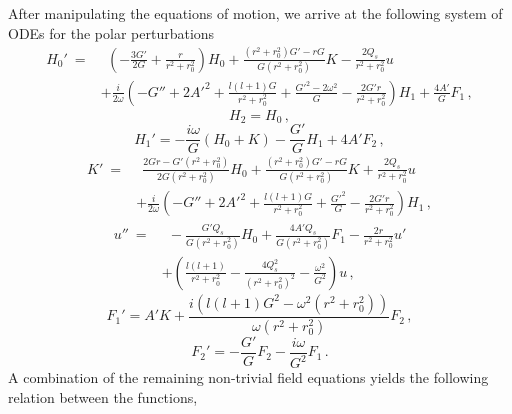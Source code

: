 \documentclass[11pt,a4paper]{article}
\begin{document}
After manipulating the equations of motion, we arrive at the following system of ODEs for the polar perturbations
%
\begin{equation}\label{eq_H0_polar}
\begin{split}
    H_0'\:= & \:\:\left(-\frac{3G'}{2G}+\frac{r}{r^2+r_0^2}\right)H_0+\frac{(r^2+r_0^2)G'-rG}{G(r^2+r_0^2)}K-\frac{2Q_s}{r^2+r_0^2}u\\
    & +\frac{i}{2\omega}\left(-G''+2A'^2+\frac{l(l+1)G}{r^2+r_0^2}+\frac{G'^2-2\omega^2}{G}-\frac{2G'r}{r^2+r_0^2}\right)H_1+\frac{4A'}{G}F_1 \,,
\end{split}
\end{equation}
%
\begin{equation}\label{eq_H2_polar}
    H_2=H_0 \,,
\end{equation}
%
\begin{equation}\label{eq_H1_polar}
    H_1'=-\frac{i\omega}{G}\left(H_0+K\right)-\frac{G'}{G}H_1+4A'F_2 \,,
\end{equation}
%
\begin{equation}\label{eq_K_polar}
\begin{split}
    K'\:= & \:\:\frac{2Gr-G'(r^2+r_0^2)}{2G(r^2+r_0^2)}H_0+\frac{(r^2+r_0^2)G'-rG}{G(r^2+r_0^2)}K+\frac{2Q_s}{r^2+r_0^2}u\\
    & +\frac{i}{2\omega}\left(-G''+2A'^2+\frac{l(l+1)G}{r^2+r_0^2}+\frac{G'^2}{G}-\frac{2G'r}{r^2+r_0^2}\right)H_1 \,,
\end{split}
\end{equation}
%
\begin{equation}\label{eq_u_polar}
\begin{split}
    u''\:= & \:\:-\frac{G'Q_s}{G(r^2+r_0^2)}H_0+\frac{4A'Q_s}{G(r^2+r_0^2)}F_1-\frac{2r}{r^2+r_0^2}u'\\
    & +\left(\frac{l(l+1)}{r^2+r_0^2}-\frac{4Q_s^2}{(r^2+r_0^2)^2}-\frac{\omega^2}{G^2}\right)u \,,
\end{split}
\end{equation}
%
\begin{equation}\label{eq_F1_polar}
    F_1'=A'K+\frac{i\left(l(l+1)G^2-\omega^2(r^2+r_0^2)\right)}{\omega(r^2+r_0^2)}F_2 \,,
\end{equation}
%
\begin{equation}\label{eq_F2_polar}
    F_2'=-\frac{G'}{G}F_2-\frac{i\omega}{G^2}F_1 \,.
\end{equation}
%
A combination of the remaining non-trivial field equations yields the following relation between the functions,
%
\end{document}
